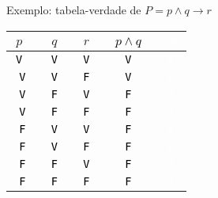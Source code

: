 \begin{frame}[fragile]{Exemplo: tabela-verdade de $P = p \land q \to r$}

    \begin{table}
        \centering
        \begin{tabular}{>{\tt}c>{\tt}c>{\tt}c>{\tt}c>{\tt}c}
            \hline
            $p$ & $q$ & $r$ & \textcolor{black}{$p\land q$} & \textcolor{white}{$P$}\\
            \hline
            \textcolor{black}{V} & \textcolor{black}{V} & \textcolor{black}{V} & \textcolor{black}{V} & \textcolor{white}{V} \\
            \hline
            \textcolor{black}{V} & \textcolor{black}{V} & \textcolor{black}{F} & \textcolor{black}{V} & \textcolor{white}{V} \\
            \hline
            \textcolor{black}{V} & \textcolor{black}{F} & \textcolor{black}{V} & \textcolor{black}{F} & \textcolor{white}{V} \\
            \hline
            \textcolor{black}{V} & \textcolor{black}{F} & \textcolor{black}{F} & \textcolor{black}{F} & \textcolor{white}{V} \\
            \hline
            \textcolor{black}{F} & \textcolor{black}{V} & \textcolor{black}{V} & \textcolor{black}{F} & \textcolor{white}{V} \\
            \hline
            \textcolor{black}{F} & \textcolor{black}{V} & \textcolor{black}{F} & \textcolor{black}{F} & \textcolor{white}{V} \\
            \hline
            \textcolor{black}{F} & \textcolor{black}{F} & \textcolor{black}{V} & \textcolor{black}{F} & \textcolor{white}{V} \\
            \hline
            \textcolor{black}{F} & \textcolor{black}{F} & \textcolor{black}{F} & \textcolor{black}{F} & \textcolor{white}{V} \\
            \hline
        \end{tabular}
    \end{table}
\end{frame}

